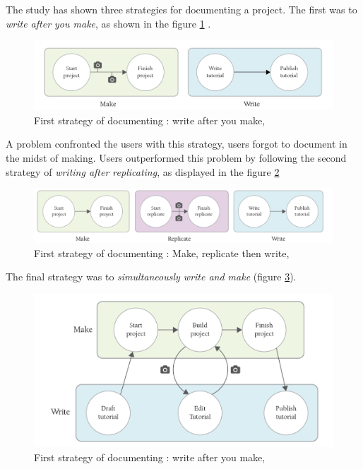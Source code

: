 The study has shown three strategies for documenting a project. The first was to \textit{write after you make}, as shown in the figure \ref{img-writemake}  \cite{tseng2016making}.
\begin{figure}[ht!]
	\includegraphics[scale=0.34]{./images/img-writemake.png}
	\caption{First strategy of documenting : write after you make, \cite{tseng2016making}}
	\label{img-writemake}
\end{figure}

A problem confronted the users with this strategy, users forgot to document in the midst of making. Users outperformed this problem by following the second strategy of \textit{writing after replicating}, as displayed in the figure \ref{img-makereplicatewrite} \cite{scholar:Tseng:2014:PVP:2598510.2598540}
\begin{figure}[ht!]
	\includegraphics[scale=0.34]{./images/img-makereplicatewrite.png}
	\caption{First strategy of documenting : Make, replicate  then write, \cite{tseng2016making}}
	\label{img-makereplicatewrite}
\end{figure}

The final strategy was to \textit{simultaneously write and make} (figure \ref{img-makewritesimultanously}). 
\begin{figure}[ht!]
	\includegraphics[scale=0.34]{./images/img-makewritesimultanously}
	\caption{First strategy of documenting : write after you make, \cite{tseng2016making}}
	\label{img-makewritesimultanously}
\end{figure}

